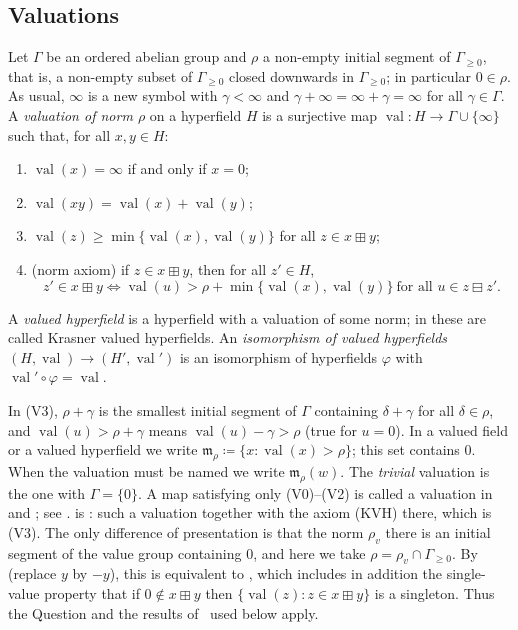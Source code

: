 \documentclass[11pt]{amsart}
\numberwithin{equation}{section}
\newcommand{\hplus}{\boxplus}
\newcommand{\hminus}{\boxminus}
\newcommand{\val}{\operatorname{val}}
\newcommand{\m}{\mathfrak m}
\begin{document}
\subsection{Valuations}
\begin{definition}\label{def:valuation}
Let $\Gamma$ be an ordered abelian group and $\rho$ a non-empty initial segment of $\Gamma_{\ge0}$, that is, a non-empty subset of $\Gamma_{\ge0}$ closed downwards in $\Gamma_{\ge0}$; in particular $0\in\rho$. As usual, $\infty$ is a new symbol with $\gamma<\infty$ and $\gamma+\infty=\infty+\gamma=\infty$ for all $\gamma\in\Gamma$. A \emph{valuation of norm $\rho$} on a hyperfield $H$ is a surjective map $\val\colon H\to\Gamma\cup\{\infty\}$ such that, for all $x,y\in H$:
\begin{enumerate}
\item[(V0)] $\val(x)=\infty$ if and only if $x=0$;
\item[(V1)] $\val(xy)=\val(x)+\val(y)$;
\item[(V2)] $\val(z)\ge\min\{\val(x),\val(y)\}$ for all $z\in x\hplus y$;
\item[(V3)] \textup{(norm axiom)} if $z\in x\hplus y$, then for all $z'\in H$,
\[
 z'\in x\hplus y \iff \val(u)>\rho+\min\{\val(x),\val(y)\}\ \text{for all } u\in z\hminus z'.
\]
\end{enumerate}
A \emph{valued hyperfield} is a hyperfield with a valuation of some norm; in \cite[Definition~4.6]{Linzi25} these are called Krasner valued hyperfields. An \emph{isomorphism of valued hyperfields} $(H,\val)\to(H',\val')$ is an isomorphism of hyperfields $\varphi$ with $\val'\circ\varphi=\val$.
\end{definition}

In (V3), $\rho+\gamma$ is the smallest initial segment of $\Gamma$ containing $\delta+\gamma$ for all $\delta\in\rho$, and $\val(u)>\rho+\gamma$ means $\val(u)-\gamma>\rho$ (true for $u=0$). In a valued field or a valued hyperfield we write $\m_\rho\coloneqq\{x:\val(x)>\rho\}$; this set contains $0$. When the valuation must be named we write $\m_\rho(w)$. The \emph{trivial} valuation is the one with $\Gamma=\{0\}$. A map satisfying only (V0)--(V2) is called a valuation in \cite[Definition~4.1]{KLS22} and \cite[Definition~3.1]{Linzi25}; see \cite[Remark~1.9]{LT25}.  is \cite[Definition~4.6]{Linzi25}: such a valuation together with the axiom (KVH) there, which is (V3). The only difference of presentation is that the norm $\rho_v$ there is an initial segment of the value group containing $0$, and here we take $\rho=\rho_v\cap\Gamma_{\ge0}$. By \cite[Proposition~4.8(i)]{Linzi25} (replace $y$ by $-y$), this is equivalent to \cite[Definition~1.8]{LT25}, which includes in addition the single-value property that if $0\notin x\hplus y$ then $\{\val(z):z\in x\hplus y\}$ is a singleton. Thus the Question and the results of~\cite{LT25} used below apply.
\end{document}
